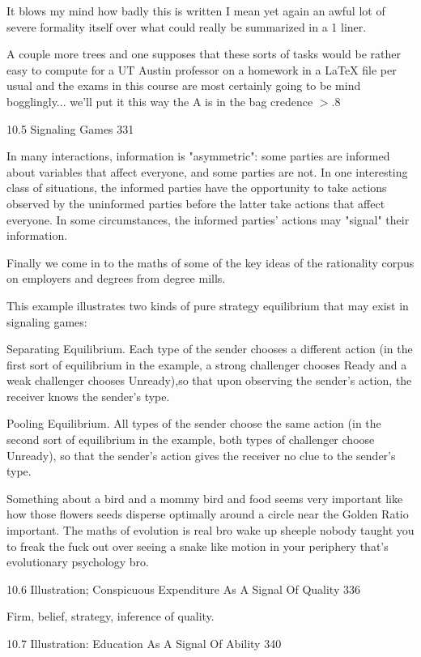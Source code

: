 It blows my mind how badly this is written I mean yet again an awful lot of severe formality itself over what could really be summarized in a 1 liner.

A couple more trees and one supposes that these sorts of tasks would be rather easy to compute for a UT Austin professor on a homework in a LaTeX file per usual and the exams in this course are most certainly going to be mind bogglingly... we'll put it this way the A is in the bag credence $>.8$

10.5 Signaling Games 331

In many interactions, information is "asymmetric": some parties are informed about variables that affect everyone, and some parties are not. In one interesting class of situations, the informed parties have the opportunity to take actions observed by the uninformed parties before the latter take actions that affect everyone. In some circumstances, the informed parties' actions may "signal" their information.

Finally we come in to the maths of some of the key ideas of the rationality corpus on employers and degrees from degree mills.

This example illustrates two kinds of pure strategy equilibrium that may exist in signaling games:

Separating Equilibrium. Each type of the sender chooses a different action (in the first sort of equilibrium in the example, a strong challenger chooses Ready and a weak challenger chooses Unready),so that upon observing the sender's action, the receiver knows the sender's type.

Pooling Equilibrium. All types of the sender choose the same action (in the second sort of equilibrium in the example, both types of challenger choose Unready), so that the sender's action gives the receiver no clue to the sender's type.

Something about a bird and a mommy bird and food seems very important like how those flowers seeds disperse optimally around a circle near the Golden Ratio important. The maths of evolution is real bro wake up sheeple nobody taught you to freak the fuck out over seeing a snake like motion in your periphery that's evolutionary psychology bro.

10.6 Illustration; Conspicuous Expenditure As A Signal Of Quality 336

Firm, belief, strategy, inference of quality.

10.7 Illustration: Education As A Signal Of Ability 340

